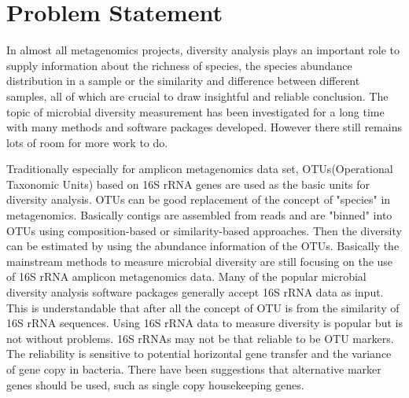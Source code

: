 \section{Problem Statement}


In almost all  metagenomics projects, diversity analysis plays an important
role to supply information about the richness of species, the species abundance
distribution in a sample or the similarity and difference between different 
samples, all of which are crucial to draw insightful and reliable conclusion. 
The topic of microbial diversity measurement
has been investigated for a long time with many methods and software packages
developed. However there still remains lots of room for more work to do.


Traditionally especially for amplicon metagenomics data set, OTUs(Operational 
Taxonomic Units) based on 16S rRNA genes are used as the basic units for 
diversity analysis. OTUs can be good replacement of the concept of "species" in 
metagenomics. Basically contigs are assembled from reads and are "binned" into
OTUs using composition-based or similarity-based approaches. Then the diversity
can be estimated by using the abundance information of the OTUs.
Basically the mainstream methods to measure microbial diversity are still
focusing on the use of 16S rRNA amplicon metagenomics data. 
Many of the
popular microbial diversity analysis software packages generally accept 
16S rRNA data as
input. This is understandable that after all the concept of OTU is from the
similarity of 16S rRNA sequences. Using 16S rRNA data to measure diversity is
popular but is not without problems. 16S rRNAs may not be that reliable to be
OTU markers. The reliability is sensitive to potential horizontal gene transfer
and the variance of gene copy in bacteria. There have been suggestions that
alternative marker genes should be used, such as single copy housekeeping genes.

